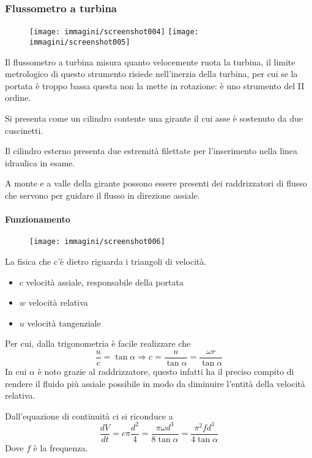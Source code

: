 \documentclass[a4paper, 15pt]{article}
\begin{document}
\subsubsection{Flussometro a turbina}
\begin{adjustwidth}{2in}{}	
	\begin{figure}[H]
		\centering
		\texttt{[image: immagini/screenshot004]}
		\texttt{[image: immagini/screenshot005]}		
		\label{fig:screenshot004}
	\end{figure}
	Il flussometro a turbina misura quanto velocemente ruota la turbina, il limite metrologico di questo strumento risiede nell'inerzia della turbina, per cui se la portata è troppo bassa questa non la mette in rotazione: è uno strumento del II ordine. \newline 
	
	Si presenta come un cilindro contente una girante il cui asse è sostenuto da due cuscinetti.
	
	Il cilindro esterno presenta due estremità filettate per l’inserimento nella
	linea idraulica in esame.
	
	A monte e a valle della girante possono essere presenti dei
	raddrizzatori di flusso che servono per guidare il flusso in direzione
	assiale.
\newpage
	\paragraph{Funzionamento} 
	\begin{figure}[H]
		\centering
		\texttt{[image: immagini/screenshot006]}
		\label{fig:screenshot006}
	\end{figure}
	La fisica che c'è dietro riguarda i triangoli di velocità. 
	\begin{itemize}
		\item $c$ velocità assiale, responsabile della portata 
		\item $w$ velocità relativa
		\item $u$ velocità tangenziale
	\end{itemize}
	Per cui, dalla trigonometria è facile realizzare che 
	\[\dfrac{u}{c} = \tan\alpha \Rightarrow c = \dfrac{u}{\tan\alpha} = \dfrac{\omega r}{\tan\alpha}\]
	In cui $\alpha$ è noto grazie al raddrizzatore, questo infatti ha il preciso compito di rendere il fluido più assiale possibile in modo da diminuire l'entità della velocità relativa.\newline 
	
	Dall'equazione di continuità ci si riconduce a 
	\[\dfrac{dV}{dt} = c\pi\dfrac{d^2}{4} = \dfrac{\pi\omega d^3}{8\tan\alpha} = \dfrac{\pi^2fd^3}{4\tan\alpha}\]
	Dove $f$ è la frequenza.
	

\end{adjustwidth}
\end{document}
